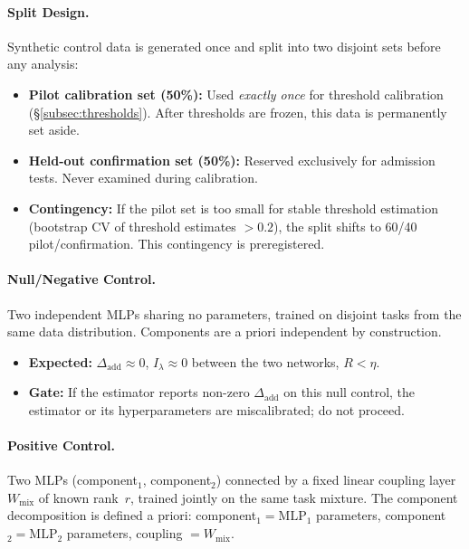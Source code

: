 \documentclass[11pt,a4paper]{article}
\theoremstyle{definition}
\theoremstyle{remark}
\newcommand{\Dadd}{\Delta_{\mathrm{add}}}
\newcommand{\Ilambda}{I_{\lambda}}
\begin{document}
\paragraph{Split Design.}
Synthetic control data is generated once and split into two disjoint sets
before any analysis:
\begin{itemize}
  \item \textbf{Pilot calibration set (50\%):} Used \emph{exactly once} for
    threshold calibration (\S\ref{subsec:thresholds}).  After thresholds are
    frozen, this data is permanently set aside.
  \item \textbf{Held-out confirmation set (50\%):} Reserved exclusively for
    admission tests.  Never examined during calibration.
  \item \textbf{Contingency:} If the pilot set is too small for stable
    threshold estimation (bootstrap CV of threshold estimates $> 0.2$), the
    split shifts to 60/40 pilot/confirmation.  This contingency is
    preregistered.
\end{itemize}

\paragraph{Null/Negative Control.}
Two independent MLPs sharing no parameters, trained on disjoint tasks from the
same data distribution.  Components are a priori independent by construction.
\begin{itemize}
  \item \textbf{Expected:} $\Dadd \approx 0$, $\Ilambda \approx 0$ between
    the two networks, $R < \eta$.
  \item \textbf{Gate:} If the estimator reports non-zero $\Dadd$ on this null
    control, the estimator or its hyperparameters are miscalibrated; do not
    proceed.
\end{itemize}

\paragraph{Positive Control.}
Two MLPs (component$_1$, component$_2$) connected by a fixed linear coupling
layer $W_{\mathrm{mix}}$ of known rank~$r$, trained jointly on the same task
mixture.  The component decomposition is defined a priori:
component$_1 = \text{MLP}_1$ parameters, component$_2 = \text{MLP}_2$
parameters, coupling $= W_{\mathrm{mix}}$.
\end{document}
